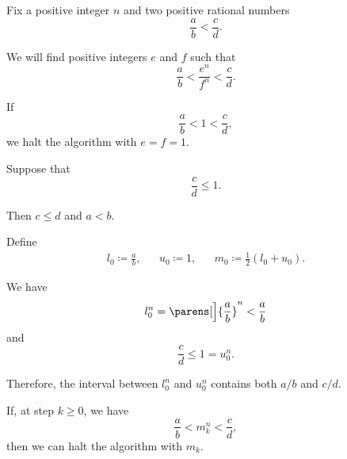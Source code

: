 \begin{algorithm}\label{alg:rational_number_power_bisection}
  Fix a positive integer \( n \) and two positive rational numbers
  \begin{equation*}
    \frac a b < \frac c d.
  \end{equation*}

  We will find positive integers \( e \) and \( f \) such that
  \begin{equation}\label{eq:alg:rational_power_bisection/condition}
    \frac a b < \frac {e^n} {f^n} < \frac c d.
  \end{equation}

  \begin{thmenum}
     If
    \begin{equation*}
      \frac a b < 1 < \frac c d,
    \end{equation*}
    we halt the algorithm with \( e = f = 1 \).

     Suppose that
    \begin{equation*}
      \frac c d \leq 1.
    \end{equation*}

    Then \( c \leq d \) and \( a < b \).

    \begin{thmenum}
       Define
      \begin{align*}
        l_0 \coloneqq \frac a b,
        &&
        u_0 \coloneqq 1,
        &&
        m_0 \coloneqq \frac 1 2 (l_0 + u_0).
      \end{align*}

      We have
      \begin{equation*}
        l_0^n = \parens[\Big]{ \frac a b }^n < \frac a b
      \end{equation*}
      and
      \begin{equation*}
        \frac c d \leq 1 = u_0^n.
      \end{equation*}

      Therefore, the interval between \( l_0^n \) and \( u_0^n \) contains both \( a / b \) and \( c / d \).

       If, at step \( k \geq 0 \), we have
      \begin{equation*}
        \frac a b < m_k^n < \frac c d,
      \end{equation*}
      then we can halt the algorithm with \( m_k \).


\end{thmenum}
\end{thmenum}
\end{algorithm}
